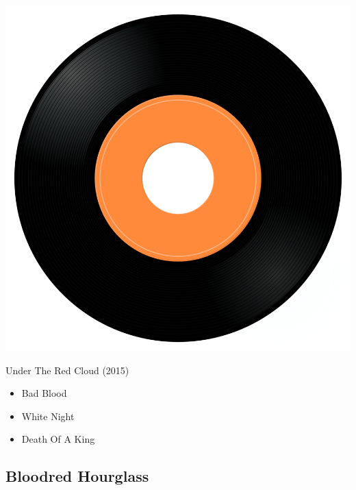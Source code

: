 \begin{minipage}[t]{0.25\textwidth}\vspace{0pt}
\captionsetup{type=figure}
\includegraphics[width=\textwidth]{Images/cover.png}
\caption*{Under The Red Cloud (2015)}
\end{minipage}
\begin{minipage}[t]{0.25\textwidth}\vspace{0pt}
\begin{itemize}[nosep,leftmargin=1em,labelwidth=*,align=left]
	\setlength{\itemsep}{0pt}
	\item Bad Blood
	\item White Night
	\item Death Of A King
\end{itemize}
\end{minipage}

\subsection{Bloodred Hourglass}

